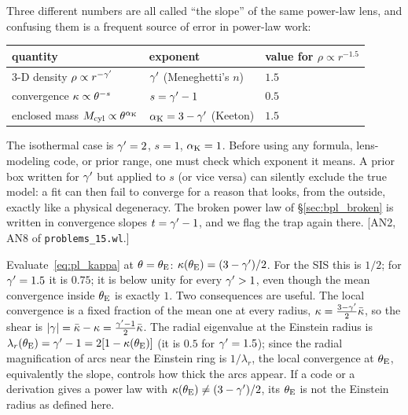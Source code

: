 \begin{annotation}[The slope-convention trap: $\gp$ versus $s=\gp-1$]
Three different numbers are all called ``the slope'' of the same
power-law lens, and confusing them is a frequent source of error in
power-law work:
\begin{center}
\begin{tabular}{lll}
  quantity & exponent & value for $\rho\propto r^{-1.5}$ \\ \hline
  3-D density $\rho\propto r^{-\gamma'}$ & $\gp$ (Meneghetti's $n$) & $1.5$ \\
  convergence $\kappa\propto\theta^{-s}$ & $s=\gp-1$ & $0.5$ \\
  enclosed mass $M_{\rm cyl}\propto\theta^{\alpha_{\rm K}}$ & $\alpha_{\rm K}=3-\gamma'$ (Keeton) & $1.5$ \\
\end{tabular}
\end{center}
The isothermal case is $\gamma'=2$, $s=1$, $\alpha_{\rm K}=1$.  Before
using any formula, lens-modeling code, or prior range, one must check
which exponent it means.  A prior box written for $\gp$ but
applied to $s$ (or vice versa) can silently exclude the true model: a
fit can then fail to converge for a reason that looks, from the
outside, exactly like a physical degeneracy.  The broken power law of
\S\ref{sec:bpl_broken} is written in convergence slopes $t=\gamma'-1$, and we flag
the trap again there.  [AN2, AN8 of \texttt{problems\_15.wl}.]
\end{annotation}

\begin{annotation}[A one-line check: $\kappab(\thetaE)=(3-\gp)/2$]
Evaluate~\eqref{eq:pl_kappa} at $\theta=\theta_{\mathrm{E}}$:
$\kappab(\thetaE)=(3-\gp)/2$.  For the SIS this is $1/2$; for
$\gamma'=1.5$ it is $0.75$; it is below unity for every $\gamma'>1$, even
though the mean convergence inside $\theta_{\mathrm{E}}$ is exactly $1$.
Two consequences are useful.  The local convergence is a fixed fraction
of the mean one at every radius, $\kappa=\tfrac{3-\gamma'}{2}\bar\kappa$,
so the shear is $|\gamma|=\bar\kappa-\kappa=\tfrac{\gamma'-1}{2}\bar\kappa$.
The radial eigenvalue at the Einstein radius is
$\lambda_r(\theta_{\mathrm{E}})=\gamma'-1=2[1-\kappa(\theta_{\mathrm{E}})]$ (it is $0.5$
for $\gamma'=1.5$); since the radial magnification of arcs near
the Einstein ring is $1/\lambda_r$, the local convergence at
$\theta_{\mathrm{E}}$, equivalently the slope, controls how thick the arcs
appear.
If a code or a derivation gives a power law with
$\kappa(\theta_{\mathrm{E}})\ne(3-\gamma')/2$, its $\theta_{\mathrm{E}}$ is not the Einstein
radius as defined here.
\end{annotation}

